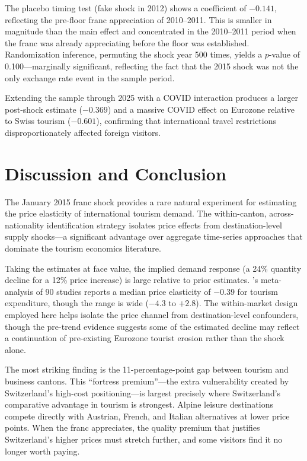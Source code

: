 \documentclass[12pt]{article}
\begin{document}
The placebo timing test (fake shock in 2012) shows a coefficient of $-0.141$, reflecting the pre-floor franc appreciation of 2010--2011. This is smaller in magnitude than the main effect and concentrated in the 2010--2011 period when the franc was already appreciating before the floor was established. Randomization inference, permuting the shock year 500 times, yields a $p$-value of 0.100---marginally significant, reflecting the fact that the 2015 shock was not the only exchange rate event in the sample period.

Extending the sample through 2025 with a COVID interaction produces a larger post-shock estimate ($-0.369$) and a massive COVID effect on Eurozone relative to Swiss tourism ($-0.601$), confirming that international travel restrictions disproportionately affected foreign visitors.

\section{Discussion and Conclusion}

The January 2015 franc shock provides a rare natural experiment for estimating the price elasticity of international tourism demand. The within-canton, across-nationality identification strategy isolates price effects from destination-level supply shocks---a significant advantage over aggregate time-series approaches that dominate the tourism economics literature.

Taking the estimates at face value, the implied demand response (a 24\% quantity decline for a 12\% price increase) is large relative to prior estimates. \citet{Crouch1996}'s meta-analysis of 90 studies reports a median price elasticity of $-0.39$ for tourism expenditure, though the range is wide ($-4.3$ to $+2.8$). The within-market design employed here helps isolate the price channel from destination-level confounders, though the pre-trend evidence suggests some of the estimated decline may reflect a continuation of pre-existing Eurozone tourist erosion rather than the shock alone.

The most striking finding is the 11-percentage-point gap between tourism and business cantons. This ``fortress premium''---the extra vulnerability created by Switzerland's high-cost positioning---is largest precisely where Switzerland's comparative advantage in tourism is strongest. Alpine leisure destinations compete directly with Austrian, French, and Italian alternatives at lower price points. When the franc appreciates, the quality premium that justifies Switzerland's higher prices must stretch further, and some visitors find it no longer worth paying.
\end{document}

